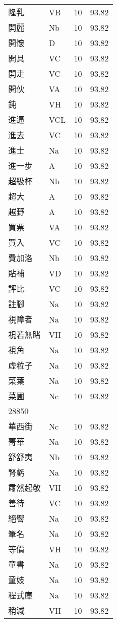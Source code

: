 \documentclass[twocolumn]{book}
\begin{document}
\begin{supertabular}{llrr}
隆乳 & VB & 10 &  93.82\\
開麗 & Nb & 10 &  93.82\\
開懷 & D & 10 &  93.82\\
開具 & VC & 10 &  93.82\\
開走 & VC & 10 &  93.82\\
開伙 & VA & 10 &  93.82\\
鈍 & VH & 10 &  93.82\\
進逼 & VCL & 10 &  93.82\\
進去 & VC & 10 &  93.82\\
進士 & Na & 10 &  93.82\\
進一步 & A & 10 &  93.82\\
超級杯 & Nb & 10 &  93.82\\
超大 & A & 10 &  93.82\\
越野 & A & 10 &  93.82\\
買票 & VA & 10 &  93.82\\
買入 & VC & 10 &  93.82\\
費加洛 & Nb & 10 &  93.82\\
貼補 & VD & 10 &  93.82\\
評比 & VC & 10 &  93.82\\
註腳 & Na & 10 &  93.82\\
視障者 & Na & 10 &  93.82\\
視若無睹 & VH & 10 &  93.82\\
視角 & Na & 10 &  93.82\\
虛粒子 & Na & 10 &  93.82\\
菜葉 & Na & 10 &  93.82\\
菜圃 & Nc & 10 &  93.82\\
28850\\
華西街 & Nc & 10 &  93.82\\
菁華 & Na & 10 &  93.82\\
舒舒夷 & Nb & 10 &  93.82\\
腎虧 & Na & 10 &  93.82\\
肅然起敬 & VH & 10 &  93.82\\
善待 & VC & 10 &  93.82\\
絕響 & Na & 10 &  93.82\\
筆名 & Na & 10 &  93.82\\
等價 & VH & 10 &  93.82\\
童書 & Na & 10 &  93.82\\
童妓 & Na & 10 &  93.82\\
程式庫 & Na & 10 &  93.82\\
稍減 & VH & 10 &  93.82\\

\end{supertabular}
\end{document}
